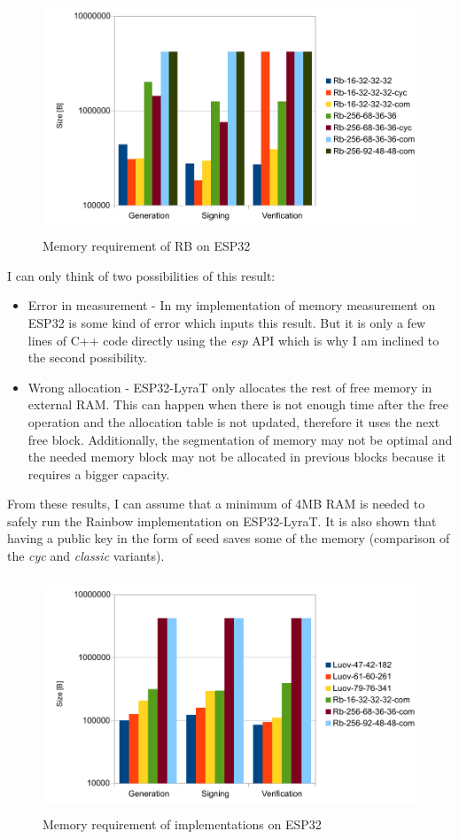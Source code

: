 \documentclass[thesis=M,english]{FITthesis}[2019/12/23]
\begin{document}
\begin{figure}[H]
\centering
\includegraphics[width=13cm,height=7cm]{images/mem-rb.pdf}
\caption{Memory requirement of RB on ESP32}
\label{mem-rb}
\end{figure}

\noindent
I can only think of two possibilities of this result:
\begin{itemize}
\item	Error in measurement - In my implementation of memory measurement on ESP32 is some kind of error which inputs this result. But it is only a few lines of C++ code directly using the \textit{esp} API which is why I am inclined to the second possibility. 
\item	Wrong allocation - ESP32-LyraT only allocates the rest of free memory in external RAM. This can happen when there is not enough time after the free operation and the allocation table is not updated, therefore it uses the next free block. Additionally, the segmentation of memory may not be optimal and the needed memory block may not be allocated in previous blocks because it requires a bigger capacity. 
\end{itemize}

\bigskip
\noindent
From these results, I can assume that a minimum of 4MB RAM is needed to safely run the Rainbow implementation on ESP32-LyraT. It is also shown that having a public key in the form of seed saves some of the memory (comparison of the \textit{cyc} and \textit{classic} variants).

\begin{figure}[H]
\centering
\includegraphics[width=13cm,height=7cm]{images/mem-both.pdf}
\caption{Memory requirement of implementations on ESP32}
\label{mem-both}
\end{figure}
\end{document}
